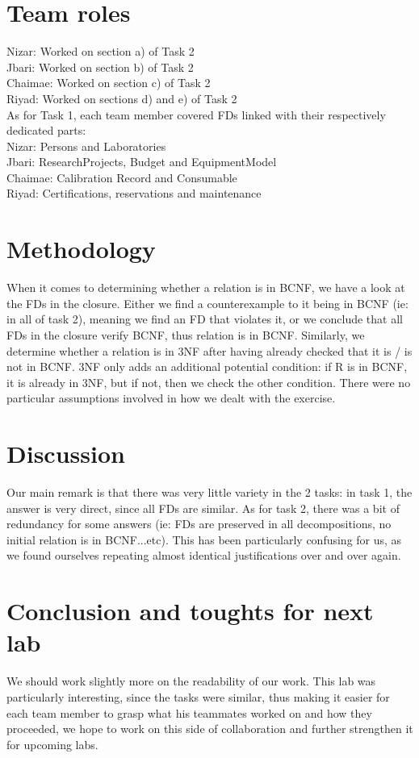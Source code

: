 \documentclass[a4paper,12pt]{article}
\begin{document}
\section{Team roles}
Nizar: Worked on section a) of Task 2\\
Jbari: Worked on section b) of Task 2\\
Chaimae: Worked on section c) of Task 2\\
Riyad: Worked on sections d) and e) of Task 2\\

As for Task 1, each team member covered FDs linked with their respectively dedicated parts: \\
Nizar: Persons and Laboratories \\
Jbari: ResearchProjects, Budget and EquipmentModel \\
Chaimae: Calibration Record and Consumable \\
Riyad: Certifications, reservations and maintenance \\


\section{Methodology}
When it comes to determining whether a relation is in BCNF, we have a look at the FDs in the closure. Either we find a counterexample to it being in BCNF (ie: in all of task 2), meaning we find an FD that violates it, or we conclude that all FDs in the closure verify BCNF, thus relation is in BCNF. Similarly, we determine whether a relation is in 3NF after having already checked that it is / is not in BCNF. 3NF only adds an additional potential condition: if R is in BCNF, it is already in 3NF, but if not, then we check the other condition. There were no particular assumptions involved in how we dealt with the exercise.


\section{Discussion}
Our main remark is that there was very little variety in the 2 tasks: in task 1, the answer is very direct, since all FDs are similar. As for task 2, there was a bit of redundancy for some answers (ie: FDs are preserved in all decompositions, no initial relation is in BCNF...etc). This has been particularly confusing for us, as we found ourselves repeating almost identical justifications over and over again. \\ 

\section{Conclusion and toughts for next lab}
We should work slightly more on the readability of our work. This lab was particularly interesting, since the tasks were similar, thus making it easier for each team member to grasp what his teammates worked on and how they proceeded, we hope to work on this side of collaboration and further strengthen it for upcoming labs. \\ 
 
\end{document}
